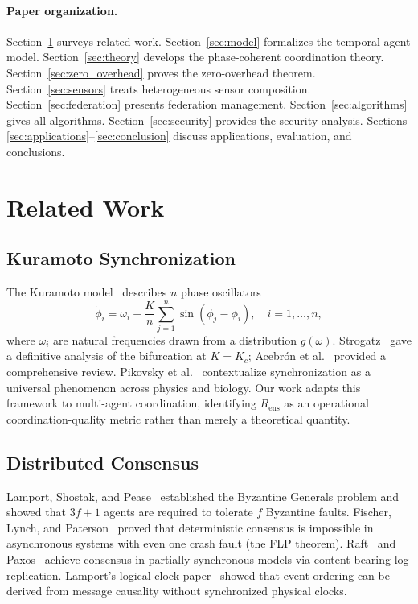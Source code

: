 \documentclass[twocolumn,10pt]{article}
\newcommand{\Rens}{R_{\mathrm{ens}}}
\newcommand{\Kc}{K_c}
\begin{document}
\paragraph{Paper organization.}
Section~\ref{sec:related} surveys related work. Section~\ref{sec:model}
formalizes the temporal agent model. Section~\ref{sec:theory} develops the
phase-coherent coordination theory. Section~\ref{sec:zero_overhead} proves
the zero-overhead theorem. Section~\ref{sec:sensors} treats heterogeneous
sensor composition. Section~\ref{sec:federation} presents federation
management. Section~\ref{sec:algorithms} gives all algorithms.
Section~\ref{sec:security} provides the security analysis. Sections
\ref{sec:applications}--\ref{sec:conclusion} discuss applications,
evaluation, and conclusions.

\section{Related Work}
\label{sec:related}

\subsection{Kuramoto Synchronization}

The Kuramoto model~\cite{Kuramoto1984} describes $n$ phase oscillators
\[
   \dot{\phi}_i = \omega_i + \frac{K}{n}\sum_{j=1}^{n}\sin(\phi_j - \phi_i),
   \quad i=1,\ldots,n,
\]
where $\omega_i$ are natural frequencies drawn from a distribution $g(\omega)$.
Strogatz~\cite{Strogatz2000} gave a definitive analysis of the bifurcation at
$K=\Kc$; Acebr\'{o}n et al.~\cite{Acebron2005} provided a comprehensive
review. Pikovsky et al.~\cite{Pikovsky2001} contextualize synchronization as
a universal phenomenon across physics and biology. Our work adapts this
framework to multi-agent coordination, identifying $\Rens$ as an operational
coordination-quality metric rather than merely a theoretical quantity.

\subsection{Distributed Consensus}

Lamport, Shostak, and Pease~\cite{Lamport1982} established the Byzantine
Generals problem and showed that $3f+1$ agents are required to tolerate $f$
Byzantine faults. Fischer, Lynch, and Paterson~\cite{Fischer1985} proved that
deterministic consensus is impossible in asynchronous systems with even one
crash fault (the FLP theorem). Raft~\cite{Ongaro2014} and
Paxos~\cite{Lamport1998} achieve consensus in partially synchronous models via
content-bearing log replication. Lamport's logical clock
paper~\cite{Lamport1978} showed that event ordering can be derived from message
causality without synchronized physical clocks.
\end{document}
